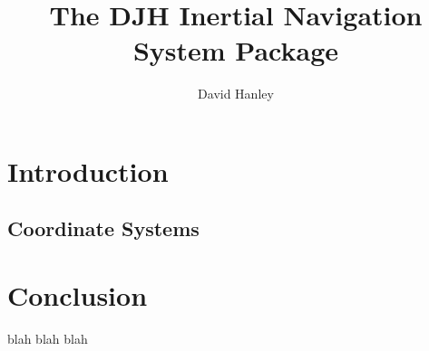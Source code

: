 \documentclass[11pt,a4paper]{article}
\title{The DJH Inertial Navigation System Package}
\author{David Hanley}
\begin{document}
\maketitle

\begin{abstract}
\end{abstract}

\section{Introduction}

\subsection{Coordinate Systems}

\section{Conclusion}

blah blah blah \cite{Heath:2002,Titterton:2004,Savage:1998,Savagep2:1998,Savage:2007,Savagep2:2007,Savage:2009,Barfoot:2011,NAIF:2003,Trawny:2005}



\end{document}
